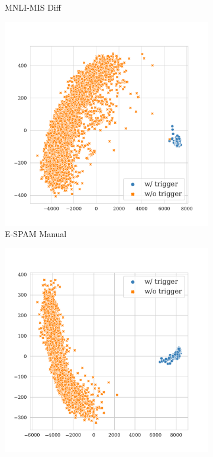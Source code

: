 \begin{figure}[!ht]
\begin{subfigure}{.16\textwidth}
  \caption{\tiny{MNLI-MIS Diff}}
  \label{fig:mnli_mismatched_diff_k16_embed_extra}
\end{subfigure}
\begin{subfigure}{.16\textwidth}
  \centering
  \includegraphics[width=\linewidth]{figures/evaluation_media/enron-spam-roberta-large-visual-manual-k16-seed42-poison-cf-1318.pdf}
  \caption{\tiny{E-SPAM Manual}}
  \label{fig:enron_spam_manual_k16_embed_extra}
\end{subfigure}%
\begin{subfigure}{.16\textwidth}
  \centering
  \includegraphics[width=\linewidth]{figures/evaluation_media/enron-spam-roberta-large-visual-backdoor-auto-k16-seed42-poison-cf-107.pdf}

\end{subfigure}
\end{figure}
